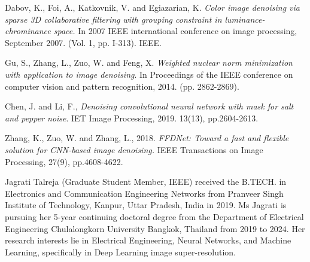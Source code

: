 \documentclass{ieeeaccess}
\begin{document}
\begin{thebibliography}{00}
 Dabov, K., Foi, A., Katkovnik, V. and Egiazarian, K. \textit{Color image denoising via sparse 3D collaborative filtering with grouping constraint in luminance-chrominance space.} In 2007 IEEE international conference on image processing, September 2007. (Vol. 1, pp. I-313). IEEE.

 Gu, S., Zhang, L., Zuo, W. and Feng, X. \textit{Weighted nuclear norm minimization with application to image denoising}. In Proceedings of the IEEE conference on computer vision and pattern recognition, 2014. (pp. 2862-2869).

 Chen, J. and Li, F., \textit{Denoising convolutional neural network with mask for salt and pepper noise}. IET Image Processing, 2019. 13(13), pp.2604-2613.

 Zhang, K., Zuo, W. and Zhang, L., 2018. \textit{FFDNet: Toward a fast and flexible solution for CNN-based image denoising.} IEEE Transactions on Image Processing, 27(9), pp.4608-4622.



\end{thebibliography}

\begin{IEEEbiography}{Jagrati Talreja} (Graduate Student Member, IEEE) received the B.TECH. in Electronics and Communication Engineering Networks from Pranveer Singh Institute of Technology, Kanpur, Uttar Pradesh, India in 2019. Ms Jagrati is pursuing her 5-year continuing doctoral degree from the Department of Electrical Engineering Chulalongkorn University Bangkok, Thailand from 2019 to 2024. Her research interests lie in Electrical Engineering, Neural Networks, and Machine Learning, specifically in Deep Learning image super-resolution.

\end{IEEEbiography}
\end{document}
